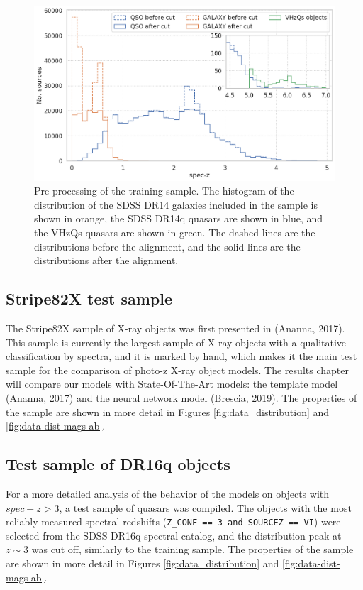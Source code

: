 \documentclass[fleqn,usenatbib]{mnras}
\begin{document}
\begin{figure}
    \centering
    \includegraphics[width=0.95\linewidth]{images/train-peaks-cut.png}
    \caption{Pre-processing of the training sample. The histogram of the distribution of the SDSS DR14 galaxies included in the sample is shown in orange, the SDSS DR14q quasars are shown in blue, and the VHzQs quasars are shown in green. The dashed lines are the distributions before the alignment, and the solid lines are the distributions after the alignment.}
    \label{fig:train-peaks-cut}
\end{figure}

\subsection{Stripe82X test sample}
The Stripe82X sample of X-ray objects was first presented in (Ananna, 2017). This sample is currently the largest sample of X-ray objects with a qualitative classification by spectra, and it is marked by hand, which makes it the main test sample for the comparison of photo-z X-ray object models. The results chapter will compare our models with State-Of-The-Art models: the template model (Ananna, 2017) and the neural network model (Brescia, 2019). The properties of the sample are shown in more detail in Figures \ref{fig:data_distribution} and \ref{fig:data-dist-mags-ab}.

\subsection{Test sample of DR16q objects}
For a more detailed analysis of the behavior of the models on objects with $spec-z > 3$, a test sample of quasars was compiled. The objects with the most reliably measured spectral redshifts (\texttt{Z\_CONF == 3 and SOURCEZ == VI}) were selected from the SDSS DR16q spectral catalog, and the distribution peak at $z \sim 3$ was cut off, similarly to the training sample. The properties of the sample are shown in more detail in Figures \ref{fig:data_distribution} and \ref{fig:data-dist-mags-ab}.
\end{document}
